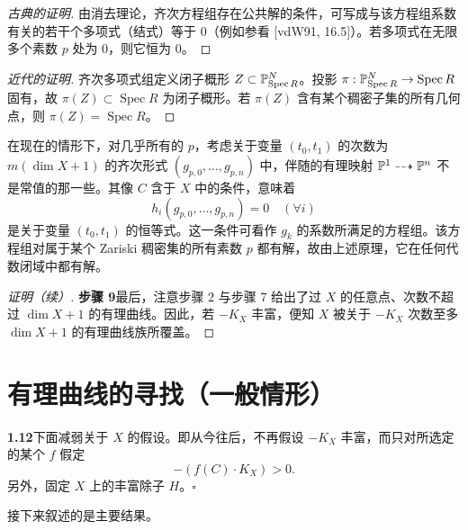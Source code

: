 \begin{proof}[古典的证明]
由消去理论，齐次方程组存在公共解的条件，可写成与该方程组系数有关的若干个多项式（结式）等于 $0$（例如参看 [vdW91, 16.5]）。若多项式在无限多个素数 $p$ 处为 $0$，则它恒为 $0$。
\end{proof}

\begin{proof}[近代的证明]
齐次多项式组定义闭子概形 $Z\subset\mathbb{P}^N_{\operatorname{Spec}R}$。投影 $\pi:\mathbb{P}^N_{\operatorname{Spec}R}\to\operatorname{Spec}R$ 固有，故 $\pi(Z)\subset\operatorname{Spec}R$ 为闭子概形。若 $\pi(Z)$ 含有某个稠密子集的所有几何点，则 $\pi(Z)=\operatorname{Spec}R$。
\end{proof}


在现在的情形下，对几乎所有的 $p$，考虑关于变量 $(t_0,t_1)$ 的次数为 $m(\dim X+1)$ 的齐次形式 $(g_{p,0},\dots,g_{p,n})$ 中，伴随的有理映射 $\mathbb{P}^1\dashrightarrow\mathbb{P}^n$ 不是常值的那一些。其像 $C$ 含于 $X$ 中的条件，意味着
\[ h_i(g_{p,0},\dots,g_{p,n})=0\quad(\forall i) \]
是关于变量 $(t_0,t_1)$ 的恒等式。这一条件可看作 $g_k$ 的系数所满足的方程组。该方程组对属于某个 Zariski 稠密集的所有素数 $p$ 都有解，故由上述原理，它在任何代数闭域中都有解。

\begin{proof}[证明（续）]
\textbf{步骤 9}\quad 最后，注意步骤 2 与步骤 7 给出了过 $X$ 的任意点、次数不超过 $\dim X+1$ 的有理曲线。因此，若 $-K_X$ 丰富，便知 $X$ 被关于 $-K_X$ 次数至多 $\dim X+1$ 的有理曲线族所覆盖。
\end{proof}

\section{有理曲线的寻找（一般情形）}


\textbf{1.12}\quad 下面减弱关于 $X$ 的假设。即从今往后，不再假设 $-K_X$ 丰富，而只对所选定的某个 $f$ 假定
\[ -(f(C)\cdot K_X)>0. \]
另外，固定 $X$ 上的丰富除子 $H$。\hfill$\square$

接下来叙述的是主要结果。

